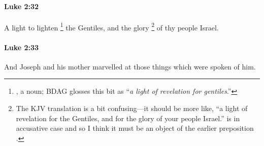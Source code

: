 		\paragraph{Luke 2:32} %
			\label{LUKE-2-32}

			A light to lighten%
				\footnote{%
					, a noun; BDAG glosses this bit as ``\textit{a light of revelation for gentiles}.''
					}
			the Gentiles, and the glory%
				\footnote{%
					The KJV translation is a bit confusing---it should be more like, ``a light of revelation for the Gentiles, and for the glory of your people Israel.''  is in accusative case and so I think it must be an object of the earlier preposition .
					}
			of thy people Israel.

			\begin{framed}
			\scriptsize
				\begin{compactdesc}
					\item[SBLG] 
				\end{compactdesc}
			\end{framed}

		\paragraph{Luke 2:33} %
			\label{LUKE-2-33}

			And Joseph and his mother marvelled at those things which were spoken of him.

